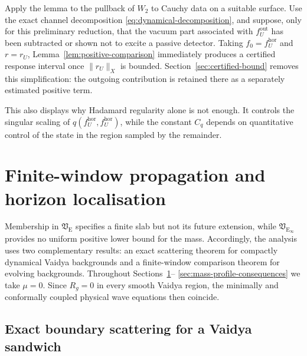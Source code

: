\documentclass[11pt,a4paper]{article}
\theoremstyle{definition}
\theoremstyle{remark}
\begin{document}
	Apply the lemma to the pullback of $W_2$ to Cauchy data on a suitable surface.
	Use the exact channel decomposition \eqref{eq:dynamical-decomposition}, and
	suppose, only for this preliminary reduction, that the vacuum part associated
	with $f_U^{\mathrm{out}}$ has been subtracted or shown not to excite a passive
	detector.  Taking
	$f_0=f_U^{\mathrm{hor}}$ and $r=r_U$, Lemma~\ref{lem:positive-comparison}
	immediately produces a certified response interval once $\|r_U\|_X$ is
	bounded.  Section~\ref{sec:certified-bound} removes this simplification: the
	outgoing contribution is retained there as a separately estimated positive
	term.
	
	This also displays why Hadamard regularity alone is not enough.  It controls
	the singular scaling of $q(f_U^{\mathrm{hor}},f_U^{\mathrm{hor}})$, while the
	constant $C_q$ depends on quantitative control of the state in the region
	sampled by the remainder.
	
	\section{Finite-window propagation and horizon localisation}
	\label{sec:target-propagation}
	
	Membership in $\mathfrak V_{\mathrm E}$ specifies a finite slab but not its
	future extension, while $\mathfrak V_{\mathrm E_\infty}$ provides no uniform
	positive lower bound for the mass.  Accordingly, the analysis uses two
	complementary results: an exact scattering theorem for compactly dynamical
	Vaidya backgrounds and a finite-window comparison theorem for evolving
	backgrounds.  Throughout Sections~\ref{sec:target-propagation}--
	\ref{sec:mass-profile-consequences}
	we take $\mu=0$.  Since $R_g=0$ in every smooth Vaidya region, the minimally
	and conformally coupled physical wave equations then coincide.
	
	\subsection{Exact boundary scattering for a Vaidya sandwich}
	
\end{document}
